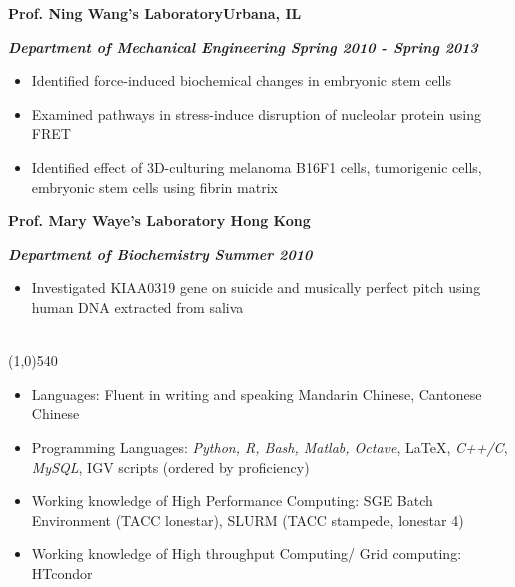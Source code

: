 \documentclass[dvips,11pt]{article}
\begin{document}
\noindent \centerline{\bf Prof. Ning Wang's Laboratory\hfill Urbana, IL}
\noindent \centerline{\bf{\textit{Department of Mechanical Engineering \hfill Spring 2010 - Spring 2013} }}
\vspace{-2mm}
\begin{itemize} \itemsep1pt \parskip0pt 
	\setlength{\itemsep}{0pt}
	\item Identified force-induced biochemical changes in embryonic stem cells
	\item Examined pathways in stress-induce disruption of nucleolar protein using FRET
	\item Identified effect of 3D-culturing melanoma B16F1 cells, tumorigenic cells, embryonic stem cells using fibrin matrix
\end{itemize}

\noindent\centerline{\bf Prof. Mary Waye's Laboratory \hfill	Hong Kong}
\noindent\centerline{\textbf{\textit{Department of Biochemistry \hfill Summer 2010}}}
\vspace{-2mm}
\begin{itemize} \itemsep1pt \parskip0pt 
	\setlength{\itemsep}{0pt}
	\item Investigated KIAA0319 gene on suicide and musically perfect pitch using human DNA extracted from saliva
\end{itemize}
\bigskip
\newpage

 \vspace{-3mm}
\noindent\\
\vspace{-8mm}
\line(1,0){540}\\
\begin{itemize} \itemsep 0pt \parskip -1pt \parsep -1pt
	\setlength{\itemsep}{-1pt}
	\item	Languages: Fluent in writing and speaking Mandarin Chinese, Cantonese Chinese
	\item	Programming Languages: {\it Python, R, Bash, Matlab, Octave}, \LaTeX, {\it C++/C},  {\it MySQL}, IGV scripts (ordered by proficiency)
	\item Working knowledge of High Performance Computing: SGE Batch Environment (TACC lonestar), SLURM (TACC stampede, lonestar 4)
	\item Working knowledge of High throughput Computing/ Grid computing: HTcondor
\end{itemize}
\end{document}
